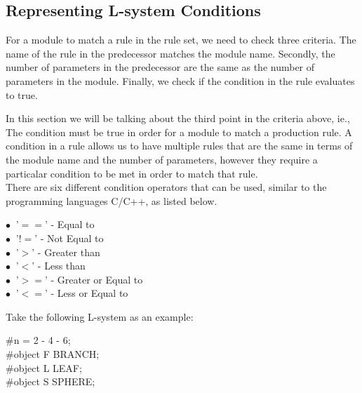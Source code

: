 \subsection{Representing L-system Conditions}

\begin{flushleft}

For a module to match a rule in the rule set, we need to check three criteria. The name of the rule in the predecessor matches the module name. Secondly, the number of parameters in the predecessor are the same as the number of parameters in the module. Finally, we check if the condition in the rule evaluates to true. \\

\vspace{5mm}

In this section we will be talking about the third point in the criteria above, ie., The condition must be true in order for a module to match a production rule. A condition in a rule allows us to have multiple rules that are the same in terms of the module name and the number of parameters, however they require a particalar condition to be met in order to match that rule. \\
There are six different condition operators that can be used, similar to the programming languages C/C++, as listed below.

\vspace{5mm}

$\bullet~$  '$==$'  - Equal to \\
$\bullet~$  '$!=$' - Not Equal to \\
$\bullet~$  '$>$' - Greater than \\
$\bullet~$  '$<$' - Less than \\
$\bullet~$  '$>=$' - Greater or Equal to \\
$\bullet~$  '$<=$' - Less or Equal to \\

\vspace{5mm}

Take the following L-system as an example:\\

\vspace{5mm}

\#n = 2 - 4 - 6; \\
\#object F BRANCH; \\
\#object L LEAF; \\
\#object S SPHERE; \\


\end{flushleft}

